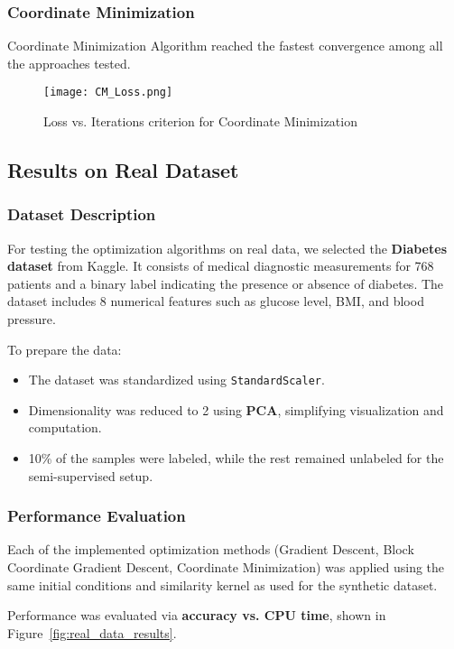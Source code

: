 \documentclass{article}
\begin{document}
\subsubsection{Coordinate Minimization}
Coordinate Minimization Algorithm reached the fastest convergence among all the approaches tested.

\begin{figure}[h]
    \centering
    \texttt{[image: CM\_Loss.png]}
    \caption{Loss vs. Iterations criterion for Coordinate Minimization}
    \label{fig:my_image}
\end{figure}

\subsection{Results on Real Dataset}

\subsubsection{Dataset Description}
For testing the optimization algorithms on real data, we selected the \textbf{Diabetes dataset} from Kaggle. It consists of medical diagnostic measurements for 768 patients and a binary label indicating the presence or absence of diabetes. The dataset includes 8 numerical features such as glucose level, BMI, and blood pressure.

\noindent To prepare the data:
\begin{itemize}
    \item The dataset was standardized using \texttt{StandardScaler}.
    \item Dimensionality was reduced to 2 using \textbf{PCA}, simplifying visualization and computation.
    \item 10\% of the samples were labeled, while the rest remained unlabeled for the semi-supervised setup.
\end{itemize}

\subsubsection{Performance Evaluation}
Each of the implemented optimization methods (Gradient Descent, Block Coordinate Gradient Descent, Coordinate Minimization) was applied using the same initial conditions and similarity kernel as used for the synthetic dataset.

\noindent Performance was evaluated via \textbf{accuracy vs. CPU time}, shown in Figure~\ref{fig:real_data_results}.
\end{document}
